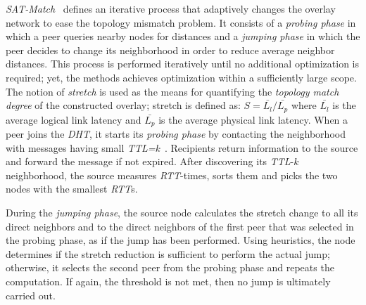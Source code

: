 \emph{SAT-Match}~\cite{RGJZ2004} defines an iterative process that 
adaptively changes the overlay network to ease the topology mismatch problem. 
It consists of a \emph{probing phase} in which a peer queries nearby nodes 
for distances and a \emph{jumping phase} in which the peer decides 
to change its neighborhood in order to reduce average neighbor distances. 
This process is performed iteratively
until no additional optimization is required; 
yet, the methods achieves optimization within a
sufficiently large scope.
The notion of \emph{stretch} is used as the means for quantifying 
the \emph{topology match degree} of the constructed overlay;
stretch is defined as: 
$S = \bar{L_l}/\bar{L_p}$ where $\bar{L_l}$ is the average logical link
latency and $\bar{L_p}$ is the average physical link latency.
% 
When a peer joins the \emph{DHT}, it starts 
its \emph{probing phase} by contacting the neighborhood with 
messages having small \emph{TTL=k}~\cite{jiang_lightflood_2008}. 
Recipients return information to the source and forward the message 
if not expired. 
After discovering its \emph{TTL}-$k$ neighborhood, 
the source measures \emph{RTT}-times, sorts them
and picks the two nodes with the smallest \emph{RTT}s.

During the \emph{jumping phase}, the source node calculates the 
stretch change to all its direct neighbors and to the direct neighbors
of the first peer that was selected in the probing phase, as if
the jump has been performed. 
Using heuristics, the node determines if the stretch
reduction is sufficient to perform the actual jump; 
otherwise, it selects the second peer from the probing phase 
and repeats the computation. If again, the
threshold is not met, then no jump is ultimately carried out.

